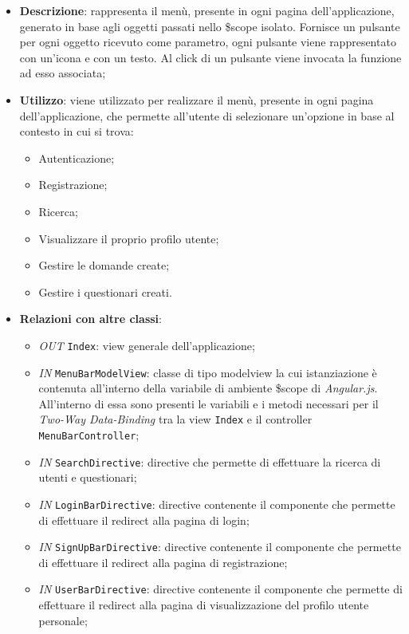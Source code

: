 \begin{itemize}
	\item \textbf{Descrizione}: rappresenta il menù, presente in ogni pagina dell'applicazione, generato in base agli oggetti passati nello \$scope isolato. Fornisce un pulsante per ogni oggetto ricevuto come parametro, ogni pulsante viene rappresentato con un’icona e con un testo. Al click di un pulsante viene invocata la funzione ad esso associata;
	\item \textbf{Utilizzo}: viene utilizzato per realizzare il menù, presente in ogni pagina dell'applicazione, che permette all'utente di selezionare un'opzione in base al contesto in cui si trova:
		\begin{itemize}
			\item Autenticazione;
			\item Registrazione;
			\item Ricerca;
			\item Visualizzare il proprio profilo utente;
			\item Gestire le domande create;
			\item Gestire i questionari creati.
		\end{itemize}
	\item \textbf{Relazioni con altre classi}: 
	\begin{itemize}
		\item \textit{OUT} \texttt{Index}: view generale dell'applicazione;
		\item \textit{IN} \texttt{MenuBarModelView}: classe di tipo modelview la cui istanziazione è contenuta all'interno della variabile di ambiente \$scope di \textit{Angular.js}. All'interno di essa sono presenti le variabili e i metodi necessari per il \textit{Two-Way Data-Binding} tra la view \texttt{Index} e il controller \texttt{MenuBarController};
		\item \textit{IN} \texttt{SearchDirective}: directive che permette di effettuare la ricerca di utenti e questionari;
		\item \textit{IN} \texttt{LoginBarDirective}: directive contenente il componente che permette di effettuare il redirect alla pagina di login;
		\item \textit{IN} \texttt{SignUpBarDirective}: directive contenente il componente che permette di effettuare il redirect alla pagina di registrazione;
		\item \textit{IN} \texttt{UserBarDirective}: directive contenente il componente che permette di effettuare il redirect alla pagina di visualizzazione del profilo utente personale;

\end{itemize}
\end{itemize}

